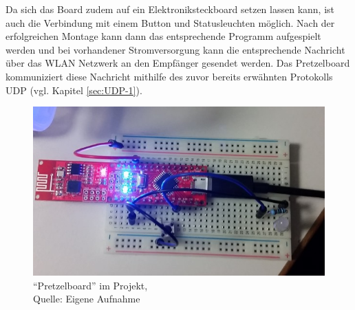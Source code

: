 Da sich das Board zudem auf ein Elektroniksteckboard setzen lassen kann, ist auch die Verbindung mit einem Button und Statusleuchten möglich. Nach der erfolgreichen Montage kann dann das entsprechende Programm aufgespielt werden und bei vorhandener Stromversorgung kann die entsprechende Nachricht über das \ac{WLAN} Netzwerk an den Empfänger gesendet werden. Das Pretzelboard kommuniziert diese Nachricht mithilfe des zuvor bereits erwähnten Protokolls \ac{UDP} (vgl. Kapitel \ref{sec:UDP-1}).


\begin{figure}[!htb]
	\centering
	\includegraphics[scale=0.6]{Pretzel_Projekt.jpg}
	\caption[``Pretzelboard'' im Projekt]{``Pretzelboard'' im Projekt,\\ Quelle: Eigene Aufnahme}
\end{figure}
